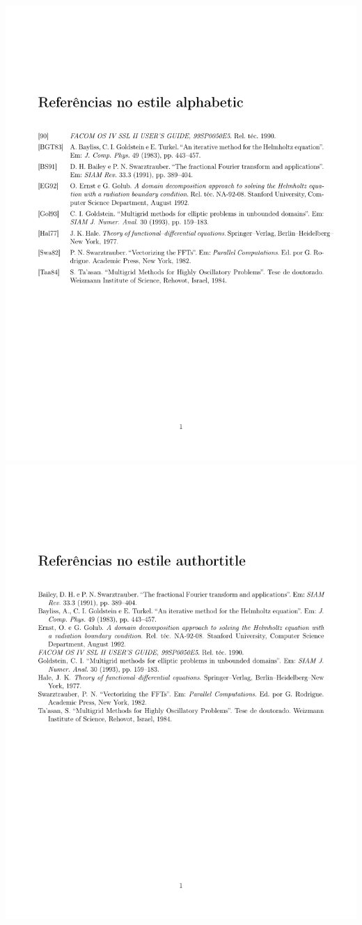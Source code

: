 \includegraphics[width=1\textwidth]{biblatex_style_samples/alphabetic} \\
\includegraphics[width=1\textwidth]{biblatex_style_samples/authortitle} \\
